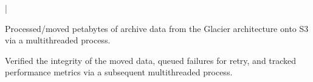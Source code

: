 \documentclass[letterpaper]{deedy-resume}
\begin{document}
\begin{minipage}[t]{0.68\textwidth}
 |
\begin{tightitemize}
\item Processed/moved petabytes of archive data from the Glacier architecture onto S3 via a multithreaded process. \\
\item Verified the integrity of the moved data, queued failures for retry, and tracked performance metrics via a subsequent multithreaded process. \\
\end{tightitemize}
\sectionspace 

\end{minipage}
\end{document}
